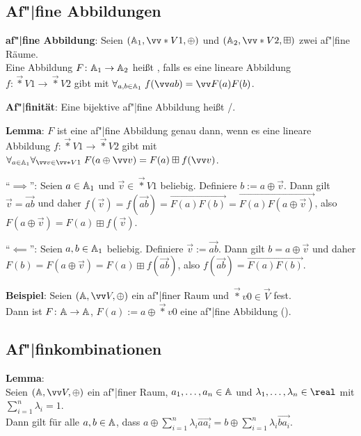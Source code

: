 \pagebreak

\subsection{%
    Af"|fine Abbildungen%
}

\textbf{af"|fine Abbildung}:
Seien $(\AA_1, \vec*{V}{1}, \oplus)$ und $(\AA_2, \vec*{V}{2}, \boxplus)$ zwei af"|fine Räume.\\
Eine Abbildung $F\colon \AA_1 \to \AA_2$ heißt , falls
es eine lineare Abbildung $f\colon \vec*{V}{1} \to \vec*{V}{2}$ gibt mit
$\forall_{a, b \in \AA_1}\; f(\vec{ab}) = \vec{F(a)F(b)}$.

\textbf{Af"|finität}:
Eine bijektive af"|fine Abbildung heißt /.

\linie

\textbf{Lemma}:
$F$ ist eine af"|fine Abbildung genau dann, wenn es eine
lineare Abbildung $f\colon \vec*{V}{1} \to \vec*{V}{2}$ gibt mit
$\forall_{a \in \AA_1} \forall_{\vec{v} \in \vec*{V}{1}}\;
F(a \oplus \vec{v}) = F(a) \boxplus f(\vec{v})$.

\begin{Beweis}
    "`$\implies$"':
    Seien $a \in \AA_1$ und $\vec{v} \in \vec*{V}{1}$ beliebig.
    Definiere $b := a \oplus \vec{v}$.
    Dann gilt $\vec{v} = \vec{ab}$ und daher
    $f(\vec{v}) = f(\vec{ab}) = \vec{F(a)F(b)} = \vec{F(a) F(a \oplus \vec{v})}$,
    also $F(a \oplus \vec{v}) = F(a) \boxplus f(\vec{v})$.

    "`$\impliedby$"':
    Seien $a, b \in \AA_1$ beliebig.
    Definiere $\vec{v} := \vec{ab}$.
    Dann gilt $b = a \oplus \vec{v}$ und daher\\
    $F(b) = F(a \oplus \vec{v}) = F(a) \boxplus f(\vec{ab})$,
    also $f(\vec{ab}) = \vec{F(a)F(b)}$.
\end{Beweis}

\linie

\textbf{Beispiel}:
Seien $(\AA, \vec{V}, \oplus)$ ein af"|finer Raum und $\vec*{v}{0} \in \vec{V}$ fest.\\
Dann ist $F\colon \AA \to \AA$, $F(a) := a \oplus \vec*{v}{0}$
eine af"|fine Abbildung ().

\subsection{%
    Af"|finkombinationen%
}

\textbf{Lemma}:\\
Seien $(\AA, \vec{V}, \oplus)$ ein af"|finer Raum,
$a_1, \dotsc, a_n \in \AA$ und $\lambda_1, \dotsc, \lambda_n \in \real$
mit $\sum_{i=1}^n \lambda_i = 1$.\\
Dann gilt für alle $a, b \in \AA$, dass
$a \oplus \sum_{i=1}^n \lambda_i \vec{aa_i} = b \oplus \sum_{i=1}^n \lambda_i \vec{ba_i}$.

